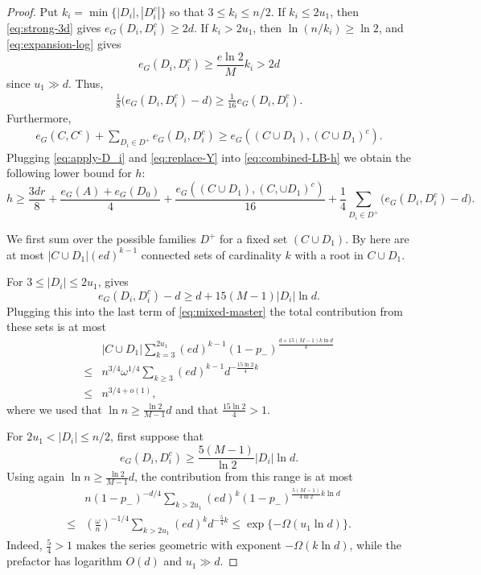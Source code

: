 \documentclass[10pt,a4paper]{amsart}
\begin{document}
\begin{proof}
Put $k_i=\min\{|D_i|,|D_i^c|\}$ so that $3\le k_i\le n/2$.
If $k_i\le2u_1$, then \eqref{eq:strong-3d} gives $e_G(D_i, D_i^c)\ge2d$.
If $k_i>2u_1$, then $\ln(n/k_i)\ge\ln 2$, and \eqref{eq:expansion-log} gives
\[
 e_G(D_i, D_i^c)\ge\frac{e\ln 2}{M}k_i>2d
\]
since $u_1\gg d$. Thus,
\begin{align} \label{eq:apply-D_i}
    \frac18\bigl(e_G(D_i, D_i^c)-d\bigr)\ge\frac1{16}e_G(D_i, D_i^c).
\end{align}
Furthermore, 
 \begin{align} \label{eq:replace-Y}
     e_G(C, C^c)+\sum_{D_i\in D^+}e_G(D_i, D_i^c) \geq e_G((C \cup D_1), (C \cup D_1)^c).
 \end{align}
Plugging \eqref{eq:apply-D_i} and \eqref{eq:replace-Y} into \eqref{eq:combined-LB-h} we obtain the following lower bound for $h$:
\begin{equation}\label{eq:mixed-master}
 h\ge\frac{3dr}{8}
 +\frac{e_G(A)+e_G(D_0)}4
 +\frac{e_G((C \cup D_1), (C, \cup D_1)^c)}{16}
 +\frac14\sum_{D_i \in D^+}\bigl(e_G(D_i, D_i^c)-d\bigr).
\end{equation}

We first sum over the possible families $D^+$ for a fixed set $(C \cup D_1)$.
By  here are at most $|C \cup D_1|(ed)^{k-1}$ connected sets of cardinality $k$ with a root in $C \cup D_1$.

For $3\le |D_i|\le2u_1$,  gives
\begin{equation*}\label{eq:component-small-boundary}
 e_G(D_i, D_i^c)-d \ge d+15(M-1)|D_i|\ln d.
\end{equation*}
Plugging this into the last term of \eqref{eq:mixed-master} the total contribution from these sets is at most
\begin{align*}
    &|C \cup D_1| \sum_{k=3}^{2u_1} (ed)^{k-1} (1-p_-)^{\frac{d+15(M-1)k \ln d}{4}}\\
    \leq & n^{3/4} \omega^{1/4} \sum_{k \geq 3} (ed)^{k-1} d^{-\frac{15 \ln 2}{4} k}\\
    \leq & n^{3/4+o(1)},
\end{align*}
where we used that $\ln n \geq \frac{\ln 2}{M-1} d$ and that $\frac{15 \ln 2}{4}>1$.

For $2u_1<|D_i|\le n/2$, first suppose that
\[
 e_G(D_i, D_i^c) \ge \frac{5(M-1)}{\ln 2}|D_i|\ln d.
\]
Using again $\ln n \geq \frac{\ln 2}{M-1}d$, the contribution from this range is at most
\begin{align*}
    &n (1-p_-)^{-d/4}\sum_{k>2u_1}(ed)^k (1-p_-)^{\frac{5(M-1)}{4 \ln 2} k \ln d}\\
    \leq & \left(\frac{\omega}{n} \right)^{-1/4} \sum_{k >2u_1} (ed)^k d^{-\frac{5}{4}k}
 \le\exp\{-\Omega(u_1\ln d)\}.
\end{align*}
Indeed, $\frac{5}{4}>1$ makes the series geometric with exponent $-\Omega(k\ln d)$, while the prefactor has logarithm $O(d)$ and $u_1\gg d$.


\end{proof}
\end{document}
